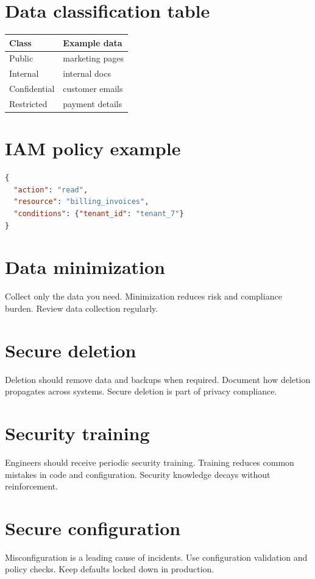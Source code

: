 \section{Data classification table}
\begin{tabularx}{\textwidth}{@{}lX@{}}
\toprule
Class & Example data \\
\midrule
Public & marketing pages \\
Internal & internal docs \\
Confidential & customer emails \\
Restricted & payment details \\
\bottomrule
\end{tabularx}

\section{IAM policy example}
\begin{lstlisting}[language=JSON]
{
  "action": "read",
  "resource": "billing_invoices",
  "conditions": {"tenant_id": "tenant_7"}
}
\end{lstlisting}

\section{Data minimization}
Collect only the data you need.
Minimization reduces risk and compliance burden.
Review data collection regularly.

\section{Secure deletion}
Deletion should remove data and backups when required.
Document how deletion propagates across systems.
Secure deletion is part of privacy compliance.

\section{Security training}
Engineers should receive periodic security training.
Training reduces common mistakes in code and configuration.
Security knowledge decays without reinforcement.

\section{Secure configuration}
Misconfiguration is a leading cause of incidents.
Use configuration validation and policy checks.
Keep defaults locked down in production.

